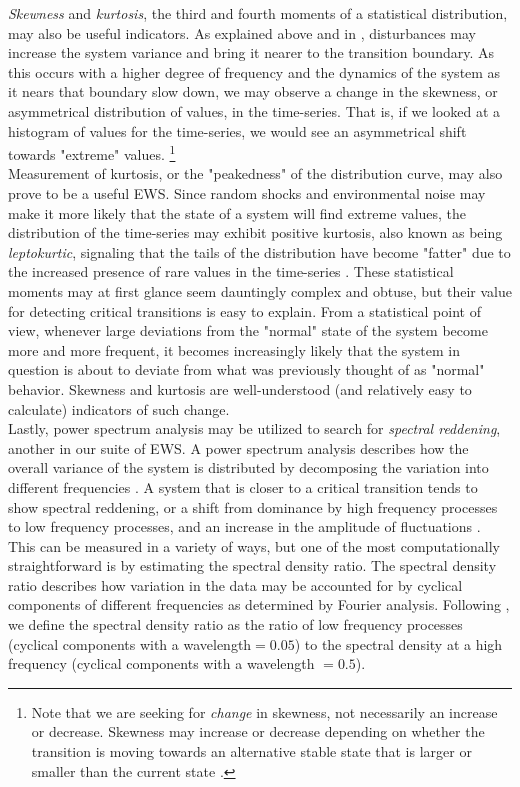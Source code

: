 \documentclass[12pt]{article}
\begin{document}
\emph{Skewness} and \emph{kurtosis}, the third and fourth moments of a statistical distribution, may also be useful indicators. As explained above and  in \cite{Dakos2012}, disturbances may increase the system variance and bring it nearer to the transition boundary. As this occurs with a higher degree of frequency and the dynamics of the system as it nears that boundary slow down, we may observe a change in the skewness, or asymmetrical distribution of values, in the time-series. That is, if we looked at a histogram of values for the time-series, we would see an asymmetrical shift towards "extreme" values. \footnote{Note that we are seeking for \emph{change} in skewness, not necessarily an increase or decrease. Skewness may increase or decrease depending on whether the transition is moving towards an alternative stable state that is larger or smaller than the current state \cite{Scheffer2009a}.}\\

Measurement of kurtosis, or the "peakedness" of the distribution curve, may also prove to be a useful EWS. Since random shocks and environmental noise may make it more likely that the state of a system will find extreme values, the distribution of the time-series may exhibit positive kurtosis, also known as being \emph{leptokurtic}, signaling that the tails of the distribution have become "fatter" due to the increased presence of rare values in the time-series \cite{DeCarlo1997}\cite{Biggs2009}. These statistical moments may at first glance seem dauntingly complex and obtuse, but their value for detecting critical transitions is easy to explain. From a statistical point of view, whenever large deviations from the "normal" state of the system become more and more frequent, it becomes increasingly likely that the system in question is about to deviate from what was previously thought of as "normal" behavior. Skewness and kurtosis are well-understood (and relatively easy to calculate) indicators of such change.\\

Lastly, power spectrum analysis may be utilized to search for \emph{spectral reddening}, another in our suite of EWS. A power spectrum analysis describes how the overall variance of the system is distributed by decomposing the variation into different frequencies \cite{Chatfield2000}. A system that is closer to a critical transition tends to show spectral reddening, or a shift from dominance by high frequency processes to low frequency processes, and an increase in the amplitude of fluctuations \cite{Biggs2009}\cite{Kleinen2003}. This can be measured in a variety of ways, but one of the most computationally straightforward is by estimating the spectral density ratio. The spectral density ratio describes how variation in the data may be accounted for by cyclical components of different frequencies as determined by Fourier analysis. Following \cite{Biggs2009}, we define the spectral density ratio as the ratio of low frequency processes (cyclical components with a wavelength$ = 0.05$) to the spectral density at a high frequency (cyclical components with a wavelength $= 0.5$).\\
\end{document}
